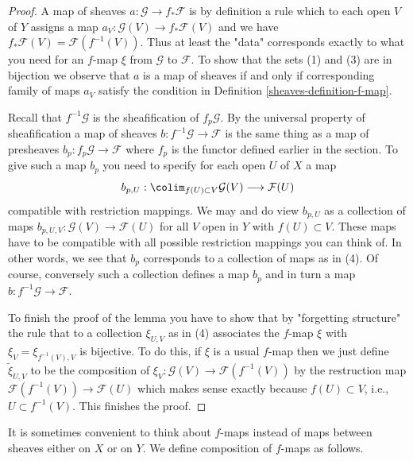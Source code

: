 \begin{proof}

A map of sheaves $a : \mathcal{G} \to f_*\mathcal{F}$
is by definition a rule which to each open $V$ of $Y$ assigns
a map $a_V : \mathcal{G}(V) \to f_*\mathcal{F}(V)$
and we have $f_*\mathcal{F}(V) = \mathcal{F}(f^{-1}(V))$.
Thus at least the "data" corresponds exactly to what you need
for an $f$-map $\xi$ from $\mathcal{G}$ to $\mathcal{F}$.
To show that the sets (1) and (3) are in bijection we observe that
$a$ is a map of sheaves if and only if corresponding family of maps $a_V$
satisfy the condition in Definition \ref{sheaves-definition-f-map}.

\medskip\noindent
Recall that $f^{-1}\mathcal{G}$ is the sheafification of $f_p\mathcal{G}$.
By the universal property of sheafification a map of sheaves
$b : f^{-1}\mathcal{G} \to \mathcal{F}$ is the same thing as a map of
presheaves $b_p : f_p\mathcal{G} \to \mathcal{F}$ where $f_p$ is the
functor defined earlier in the section. To give such a map $b_p$
you need to specify for each open $U$ of $X$ a map
$$
b_{p, U} :
\colim_{f(U) \subset V} \mathcal{G}(V)
\longrightarrow
\mathcal{F}(U)
$$
compatible with restriction mappings. We may and do view $b_{p, U}$
as a collection of maps $b_{p, U, V} : \mathcal{G}(V) \to \mathcal{F}(U)$
for all $V$ open in $Y$ with $f(U) \subset V$. These maps have to be
compatible with all possible restriction mappings you can think of.
In other words, we see that $b_p$ corresponds to a collection of maps
as in (4). Of course, conversely such a collection defines a map
$b_p$ and in turn a map $b : f^{-1}\mathcal{G} \to \mathcal{F}$.

\medskip\noindent
To finish the proof of the lemma you have to show that by
"forgetting structure" the rule that to a collection $\xi_{U, V}$
as in (4) associates the $f$-map $\xi$ with $\xi_V = \xi_{f^{-1}(V), V}$
is bijective. To do this, if $\xi$ is a usual $f$-map then we just
define $\tilde \xi_{U, V}$ to be the composition of
$\xi_V : \mathcal{G}(V) \to \mathcal{F}(f^{-1}(V))$
by the restruction map $\mathcal{F}(f^{-1}(V)) \to \mathcal{F}(U)$
which makes sense exactly because $f(U) \subset V$, i.e.,
$U \subset f^{-1}(V)$. This finishes the proof.
\end{proof}

It is sometimes convenient to think about $f$-maps
instead of maps between sheaves either on $X$ or on $Y$.
We define composition of $f$-maps as follows.

